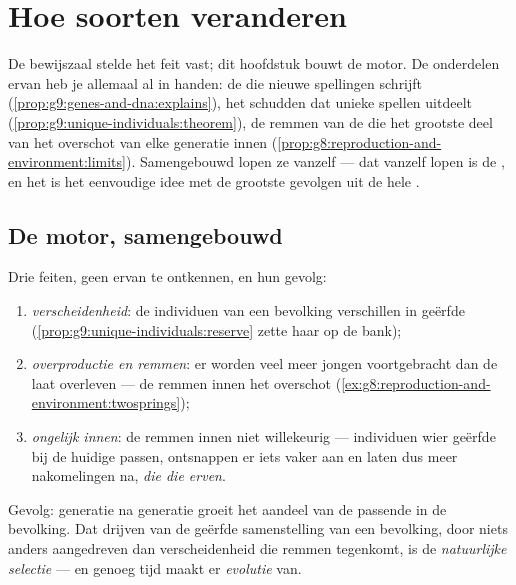 \chapter{Hoe soorten veranderen}\label{ch:g9:how-species-change}

De bewijszaal stelde het feit vast; dit hoofdstuk bouwt de motor.
De onderdelen ervan heb je allemaal al in handen: de  die
nieuwe spellingen schrijft
(\cref{prop:g9:genes-and-dna:explains}), het schudden dat unieke
spellen uitdeelt (\cref{prop:g9:unique-individuals:theorem}), de
remmen van de  die het grootste deel van het overschot van
elke generatie innen
(\cref{prop:g8:reproduction-and-environment:limits}). Samengebouwd
lopen ze vanzelf --- dat vanzelf lopen is de ,
en het is het eenvoudige idee met de grootste gevolgen uit de hele
.

\section{De motor, samengebouwd}

\begin{proposition}\label{prop:g9:how-species-change:selection}
Drie feiten, geen ervan te ontkennen, en hun gevolg:
\begin{enumerate}
  \item \emph{verscheidenheid}: de individuen van een bevolking
        verschillen in geërfde 
        (\cref{prop:g9:unique-individuals:reserve} zette haar op
        de bank);
  \item \emph{overproductie en remmen}: er worden veel meer
        jongen voortgebracht dan de  laat overleven ---
        de remmen innen het overschot
        (\cref{ex:g8:reproduction-and-environment:twosprings});
  \item \emph{ongelijk innen}: de remmen innen niet willekeurig
        --- individuen wier geërfde  bij de huidige
         passen, ontsnappen er iets vaker aan en
        laten dus meer nakomelingen na, \emph{die die 
        erven}.
\end{enumerate}
Gevolg: generatie na generatie groeit het aandeel van de passende
 in de bevolking. Dat drijven van de geërfde samenstelling
van een bevolking, door niets anders aangedreven dan
verscheidenheid die remmen tegenkomt, is de \emph{natuurlijke
selectie} --- en genoeg tijd maakt er
\emph{evolutie} van.
\end{proposition}
\admitted

